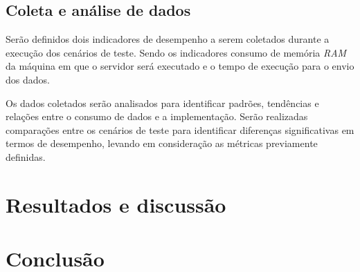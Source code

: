 \documentclass[12pt]{article}
\begin{document}
\subsection{Coleta e análise de dados}

Serão definidos dois indicadores de desempenho a serem coletados durante a execução dos cenários de teste. Sendo os indicadores
consumo de memória \textit{RAM} da máquina em que o servidor será executado e o tempo de execução para o envio dos dados.

Os dados coletados serão analisados para identificar padrões, tendências e relações entre o consumo de dados e a implementação.
Serão realizadas comparações entre os cenários de teste para identificar diferenças significativas em termos de desempenho, 
levando em consideração as métricas previamente definidas.



\section{Resultados e discussão}


\section{Conclusão}




\end{document}

